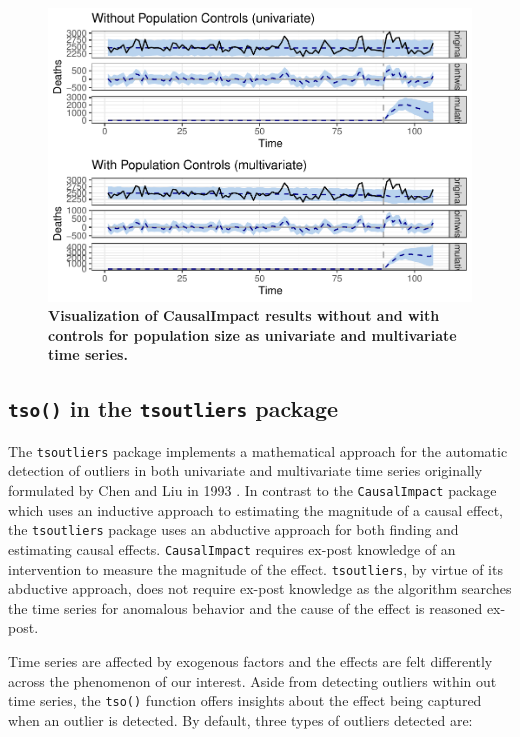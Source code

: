 \documentclass[12pt]{article}
\begin{document}
\begin{figure}
\centering
\includegraphics{MainDocument_files/figure-latex/unnamed-chunk-8-1.pdf}
\caption{\textbf{Visualization of CausalImpact results without and with controls for population size as univariate and multivariate time series.}
\label{plots}}
\end{figure}

\hypertarget{tso-in-the-tsoutliers-package}{%
\subsection{\texorpdfstring{\texttt{tso()} in the \texttt{tsoutliers}
package}{tso() in the tsoutliers package}}\label{tso-in-the-tsoutliers-package}}

The \texttt{tsoutliers} package \citep{tsoutliers} implements a
mathematical approach for the automatic detection of outliers in both
univariate and multivariate time series originally formulated by Chen
and Liu in 1993 \citep{chen1993joint}. In contrast to the
\texttt{CausalImpact} package which uses an inductive approach to
estimating the magnitude of a causal effect, the \texttt{tsoutliers}
package uses an abductive approach for both finding and estimating
causal effects. \texttt{CausalImpact} requires ex-post knowledge of an
intervention to measure the magnitude of the effect.
\texttt{tsoutliers}, by virtue of its abductive approach, does not
require ex-post knowledge as the algorithm searches the time series for
anomalous behavior and the cause of the effect is reasoned ex-post.

Time series are affected by exogenous factors and the effects are felt
differently across the phenomenon of our interest. Aside from detecting
outliers within out time series, the \texttt{tso()} function offers
insights about the effect being captured when an outlier is detected. By
default, three types of outliers detected are:
\end{document}
